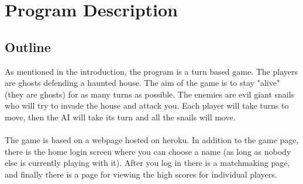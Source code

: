 \documentclass{article}
\begin{document}
\section{Program Description}

\subsection{Outline}
As mentioned in the introduction, the program is a turn based game. The players are ghosts defending a haunted house. The aim of the game is to stay "alive" (they are ghosts) for as many turns as possible. The enemies are evil giant snails who will try to invade the house and attack you. Each player will take turns to move, then the AI will take its turn and all the snails will move. \\ \\
The game is based on a webpage hosted on heroku. In addition to the game page, there is the home login screen where you can choose a name (as long as nobody else is currently playing with it). After you log in there is a matchmaking page, and finally there is a page for viewing the high scores for individual players.
\end{document}
